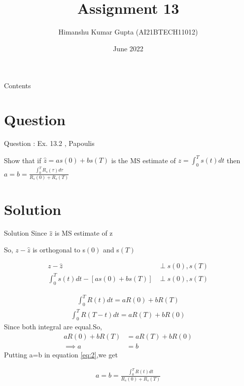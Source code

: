 \documentclass{beamer}
\title{Assignment 13}
\author{Himanshu Kumar Gupta (AI21BTECH11012)}
\date {June 2022}
\providecommand{\sbrak}[1]{\ensuremath{{}\left[#1\right]}}
\providecommand{\brak}[1]{\ensuremath{\left(#1\right)}}
\begin{document}
\begin{frame}
 \maketitle   
\end{frame}

\begin{frame}{Contents}
    \tableofcontents
\end{frame}

\section{Question}
\begin{frame}{Question : Ex. 13.2 , Papoulis}
\begin{block}

  Show that if $\hat{z} = as\brak{0} + bs\brak{T}$ is the MS estimate of $z=\int_0^Ts\brak{t}dt$ then $a=b=\frac{\int_0^TR_s\brak{\tau}d\tau}{R_s\brak{0}+R_s\brak{T}}$
\end{block}
\end{frame}

\section{Solution}
\begin{frame}{Solution}
Since $\hat{z}$ is MS estimate of z

So,
$z-\hat{z}$ is orthogonal to s\brak{0} and s\brak{T}

\begin{align}
    z-\hat{z}&\perp s\brak{0},s\brak{T}\nonumber\\
   \int_0^Ts\brak{t}dt-\sbrak{as\brak{0} + bs\brak{T}}&\perp s\brak{0},s\brak{T}
\end{align}
\end{frame}
\begin{frame}
    \begin{align}
    \label{eq:2}
       \int_0^TR\brak{t}dt=aR\brak{0}+bR\brak{T}
    \end{align}
    \begin{align}
        \int_0^TR\brak{T-t}dt=aR\brak{T}+bR\brak{0}
    \end{align}
    Since both integral are equal.So,
    \begin{align}
        aR\brak{0}+bR\brak{T}&=aR\brak{T}+bR\brak{0}\nonumber\\
        \implies a&=b
    \end{align}
    Putting a=b in equation \eqref{eq:2},we get
    
    \begin{align}
        a=b=\frac{\int_0^TR\brak{t}dt}{R_s\brak{0}+R_s\brak{T}}
    \end{align}
\end{frame}
\end{document}
